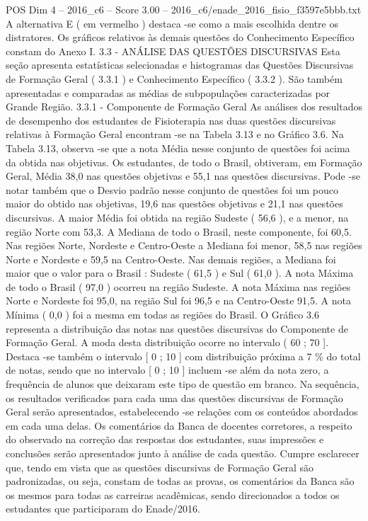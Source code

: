 \begin{textsample}{POS Dim 4 – 2016\_c6 – Score 3.00 – 2016\_c6/enade\_2016\_fisio\_f3597e5bbb.txt}
A alternativa E ( em vermelho ) destaca -se como a mais escolhida dentre os distratores.
Os gráficos relativos às demais questões do Conhecimento Específico constam do Anexo I. 3.3 - ANÁLISE DAS QUESTÕES DISCURSIVAS Esta seção apresenta estatísticas selecionadas e histogramas das Questões Discursivas de Formação Geral ( 3.3.1 ) e Conhecimento Específico ( 3.3.2 ).
São também apresentadas e comparadas as médias de subpopulações caracterizadas por Grande Região. 3.3.1 - Componente de Formação Geral As análises dos resultados de desempenho dos estudantes de Fisioterapia nas duas questões discursivas relativas à Formação Geral encontram -se na Tabela 3.13 e no Gráfico 3.6.
Na Tabela 3.13, observa -se que a nota Média nesse conjunto de questões foi acima da obtida nas objetivas.
Os estudantes, de todo o Brasil, obtiveram, em Formação Geral, Média 38,0 nas questões objetivas e 55,1 nas questões discursivas.
Pode -se notar também que o Desvio padrão nesse conjunto de questões foi um pouco maior do obtido nas objetivas, 19,6 nas questões objetivas e 21,1 nas questões discursivas.
A maior Média foi obtida na região Sudeste ( 56,6 ), e a menor, na região Norte com 53,3.
A Mediana de todo o Brasil, neste componente, foi 60,5.
Nas regiões Norte, Nordeste e Centro-Oeste a Mediana foi menor, 58,5 nas regiões Norte e Nordeste e 59,5 na Centro-Oeste.
Nas demais regiões, a Mediana foi maior que o valor para o Brasil : Sudeste ( 61,5 ) e Sul ( 61,0 ).
A nota Máxima de todo o Brasil ( 97,0 ) ocorreu na região Sudeste.
A nota Máxima nas regiões Norte e Nordeste foi 95,0, na região Sul foi 96,5 e na Centro-Oeste 91,5.
A nota Mínima ( 0,0 ) foi a mesma em todas as regiões do Brasil.
O Gráfico 3.6 representa a distribuição das notas nas questões discursivas do Componente de Formação Geral.
A moda desta distribuição ocorre no intervalo ( 60 ; 70 ].
Destaca -se também o intervalo [ 0 ; 10 ] com distribuição próxima a 7 \% do total de notas, sendo que no intervalo [ 0 ; 10 ] incluem -se além da nota zero, a frequência de alunos que deixaram este tipo de questão em branco.
Na sequência, os resultados verificados para cada uma das questões discursivas de Formação Geral serão apresentados, estabelecendo -se relações com os conteúdos abordados em cada uma delas.
Os comentários da Banca de docentes corretores, a respeito do observado na correção das respostas dos estudantes, suas impressões e conclusões serão apresentados junto à análise de cada questão.
Cumpre esclarecer que, tendo em vista que as questões discursivas de Formação Geral são padronizadas, ou seja, constam de todas as provas, os comentários da Banca são os mesmos para todas as carreiras acadêmicas, sendo direcionados a todos os estudantes que participaram do Enade/2016.

\end{textsample}
